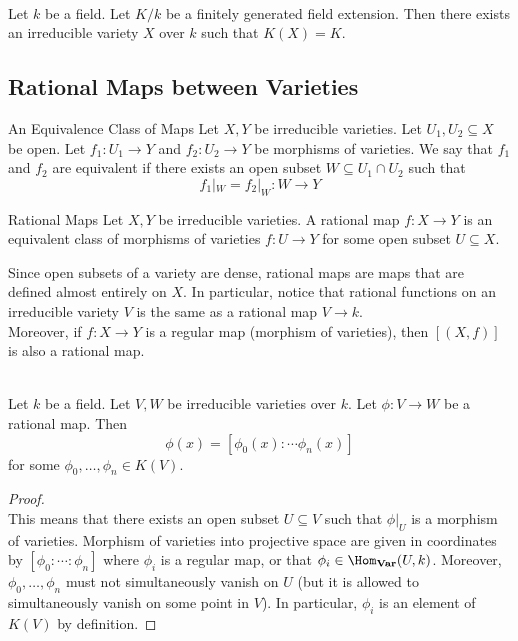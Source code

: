 \documentclass[a4paper]{article}
\begin{document}
\begin{prp}{}{}\\
Let $k$ be a field. Let $K/k$ be a finitely generated field extension. Then there exists an irreducible variety $X$ over $k$ such that $K(X)=K$. 
\end{prp}

\subsection{Rational Maps between Varieties}
\begin{defn}{An Equivalence Class of Maps}{} Let $X,Y$ be irreducible varieties. Let $U_1,U_2\subseteq X$ be open. Let $f_1:U_1\to Y$ and $f_2:U_2\to Y$ be morphisms of varieties. We say that $f_1$ and $f_2$ are equivalent if there exists an open subset $W\subseteq U_1\cap U_2$ such that $$f_1|_W=f_2|_W:W\to Y$$
\end{defn}

\begin{defn}{Rational Maps}{} Let $X,Y$ be irreducible varieties. A rational map $f:X\to Y$ is an equivalent class of morphisms of varieties $f:U\to Y$ for some open subset $U\subseteq X$. 
\end{defn}

Since open subsets of a variety are dense, rational maps are maps that are defined almost entirely on $X$. In particular, notice that rational functions on an irreducible variety $V$ is the same as a rational map $V\to k$. \\

Moreover, if $f:X\to Y$ is a regular map (morphism of varieties), then $[(X,f)]$ is also a rational map. 

\begin{lmm}{}{}\\
Let $k$ be a field. Let $V,W$ be irreducible varieties over $k$. Let $\phi:V\to W$ be a rational map. Then $$\phi(x)=[\phi_0(x):\cdots\phi_n(x)]$$ for some $\phi_0,\dots,\phi_n\in K(V)$. 
\begin{proof}\\
This means that there exists an open subset $U\subseteq V$ such that $\phi|_U$ is a morphism of varieties. Morphism of varieties into projective space are given in coordinates by $[\phi_0:\cdots:\phi_n]$ where $\phi_i$ is a regular map, or that $\phi_i\in\Hom_\bold{Var}(U,k)$. Moreover, $\phi_0,\dots,\phi_n$ must not simultaneously vanish on $U$ (but it is allowed to simultaneously vanish on some point in $V$). In particular, $\phi_i$ is an element of $K(V)$ by definition. 
\end{proof}
\end{lmm}
\end{document}
